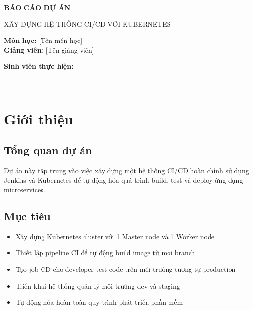 \documentclass[12pt,a4paper]{article}
\begin{document}
\begin{titlepage}
    \centering
    \vspace*{1cm}
    
    \Huge
    \textbf{BÁO CÁO DỰ ÁN}
    
    \vspace{0.5cm}
    \LARGE
    XÂY DỰNG HỆ THỐNG CI/CD VỚI KUBERNETES
    
    \vspace{1.5cm}
    
    \textbf{Môn học:} [Tên môn học]\\
    \textbf{Giảng viên:} [Tên giảng viên]
    
    \vfill
    
    \Large
    \textbf{Sinh viên thực hiện:}\\
    [Họ và tên sinh viên]\\
    [Mã số sinh viên]\\
    [Lớp]
    
    \vfill
    
    \Large
    
\end{titlepage}

\tableofcontents
\newpage

\listoffigures
\newpage

\section{Giới thiệu}

\subsection{Tổng quan dự án}
Dự án này tập trung vào việc xây dựng một hệ thống CI/CD hoàn chỉnh sử dụng Jenkins và Kubernetes để tự động hóa quá trình build, test và deploy ứng dụng microservices.

\subsection{Mục tiêu}
\begin{itemize}
    \item Xây dựng Kubernetes cluster với 1 Master node và 1 Worker node
    \item Thiết lập pipeline CI để tự động build image từ mọi branch
    \item Tạo job CD cho developer test code trên môi trường tương tự production
    \item Triển khai hệ thống quản lý môi trường dev và staging
    \item Tự động hóa hoàn toàn quy trình phát triển phần mềm
\end{itemize}
\end{document}
